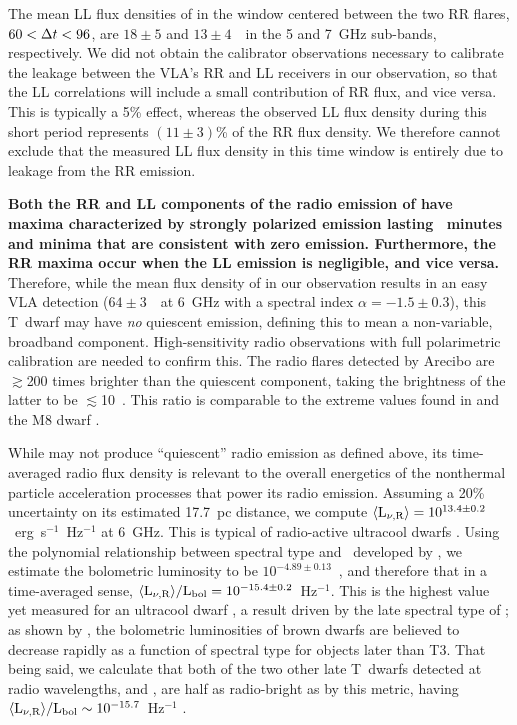 \documentclass[twocolumn, times]{aastex6}
\begin{document}
The mean LL flux densities of  in the window centered between the
two RR flares, $60 < {\Delta t} < 96$, are $18 \pm 5$ and $13 \pm 4$~\ujy\ in the 5
and 7~GHz sub-bands, respectively. We did not obtain the calibrator
observations necessary to calibrate the leakage between the VLA's RR and LL
receivers in our observation, so that the LL correlations will include a small
contribution of RR flux, and vice versa. This is typically a 5\% effect,
whereas the observed LL flux density during this short period represents $(11
\pm 3)$\% of the RR flux density. We therefore cannot exclude that the
measured LL flux density in this time window is entirely due to leakage from
the RR emission.

\textbf{Both the RR and LL components of the radio emission of 
  have maxima characterized by strongly polarized emission lasting
  ~minutes and minima that are consistent with zero emission.
  Furthermore, the RR maxima occur when the LL emission is negligible, and
  vice versa.} Therefore, while the mean flux density of  in our
observation results in an easy VLA detection ($64 \pm 3$~\ujy\ at 6~GHz with a
spectral index $\alpha = -1.5 \pm 0.3$), this T~dwarf may have \textit{no}
quiescent emission, defining this to mean a non-variable, broadband component.
High-sensitivity radio observations with full polarimetric calibration are
needed to confirm this. The radio flares detected by Arecibo are $\gtrsim$200
times brighter than the quiescent component, taking the brightness of the
latter to be $\lesssim$10~\ujy. This ratio is comparable to the extreme values
found in  \citep{wbz13} and the M8 dwarf 
\citep{bp05}.

While  may not produce ``quiescent'' radio emission as defined
above, its time-averaged radio flux density is relevant to the overall
energetics of the nonthermal particle acceleration processes that power its
radio emission. Assuming a 20\% uncertainty on its estimated 17.7~pc distance,
we compute $\langle\text{L}_{\nu,\text{R}}\rangle = 10^{13.4\pm0.2}$~erg~s$^{-1}$~Hz$^{-1}$ at 6~GHz. This is
typical of radio-active ultracool dwarfs \citep{wcb14}. Using the polynomial
relationship between spectral type and \lbol\ developed by \citet{frf+15}, we
estimate the bolometric luminosity to be $10^{-4.89 \pm 0.13}$~\lsun, and
therefore that in a time-averaged sense, $\langle\text{L}_{\nu,\text{R}}\rangle/\text{L}_\text{bol} = 10^{-15.4 \pm
  0.2}$~Hz$^{-1}$. This is the highest value yet measured for an ultracool
dwarf \citep{wcb14, wb15}, a result driven by the late spectral type of
; as shown by \citet{frf+15}, the bolometric luminosities of
brown dwarfs are believed to decrease rapidly as a function of spectral type
for objects later than \apx T3. That being said, we calculate that both of the
two other late T~dwarfs detected at radio wavelengths,  and
, are half as radio-bright as  by this metric,
having $\langle\text{L}_{\nu,\text{R}}\rangle/\text{L}_\text{bol} \sim 10^{-15.7}$~Hz$^{-1}$ \citep{wb15, khp+16}.
\end{document}
